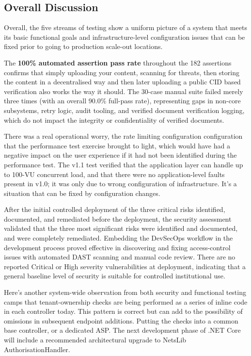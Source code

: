 \subsection{Overall Discussion}

Overall, the five streams of testing show a uniform picture of a system that meets its basic functional goals and infrastructure-level configuration issues that can be fixed prior to going to production scale-out locations.

The \textbf{100\% automated assertion pass rate} throughout the 182 assertions confirms that simply uploading your content, scanning for threats, then storing the content in a decentralised way and then later uploading a public CID based verification also works the way it should. The 30-case manual suite failed merely three times (with an overall 90.0\% full-pass rate), representing gaps in non-core subsystems, retry logic, audit tooling, and verified document verification logging, which do not impact the integrity or confidentiality of verified documents.

There was a real operational worry, the rate limiting configuration configuration that the performance test exercise brought to light, which would have had a negative impact on the user experience if it had not been identified during the performance test. The v1.1 test verified that the application layer can handle up to 100-VU concurrent load, and that there were no application-level faults present in v1.0; it was only due to wrong configuration of infrastructure. It's a situation that can be fixed by configuration changes.

After the initial controlled deployment of the three critical risks identified, documented, and remediated before the deployment, the security assessment validated that the three most significant risks were identified and documented, and were completely remediated. Embedding the DevSecOps workflow in the development process proved effective in discovering and fixing access-control issues with automated DAST scanning and manual code review. There are no reported Critical or High severity vulnerabilities at deployment, indicating that a general baseline level of security is suitable for controlled institutional use.

Here's another system-wide observation from both security and functional testing camps that tenant-ownership checks are being performed as a series of inline code in each controller today. This pattern is correct but can add to the possibility of omissions in subsequent endpoint additions. Putting the checks into a common base controller, or a dedicated ASP. The next development phase of .NET Core will include a recommended architectural upgrade to NetsLib AuthorisationHandler.

